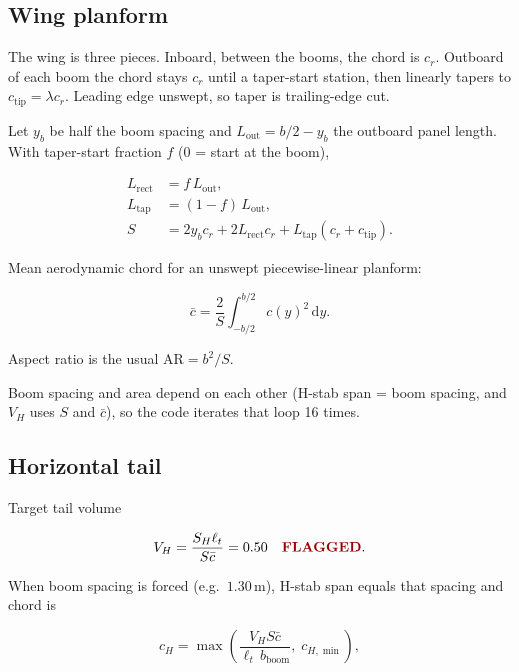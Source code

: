 \documentclass[11pt,letterpaper]{article}
\newcommand{\flag}{\textcolor{red!60!black}{\textbf{FLAGGED}}}
\begin{document}
\subsection{Wing planform}

The wing is three pieces. Inboard, between the booms, the chord is $c_r$. Outboard of each boom the chord stays $c_r$ until a taper-start station, then linearly tapers to $c_\mathrm{tip} = \lambda c_r$. Leading edge unswept, so taper is trailing-edge cut.

Let $y_b$ be half the boom spacing and $L_\mathrm{out} = b/2 - y_b$ the outboard panel length. With taper-start fraction $f$ (0 = start at the boom),

\begin{align}
  L_\mathrm{rect} &= f\, L_\mathrm{out}, \\
  L_\mathrm{tap}  &= (1-f)\, L_\mathrm{out}, \\
  S &= 2 y_b c_r + 2 L_\mathrm{rect} c_r + L_\mathrm{tap}(c_r + c_\mathrm{tip}).
\end{align}

Mean aerodynamic chord for an unswept piecewise-linear planform:

\begin{equation}
  \bar{c} = \frac{2}{S}\int_{-b/2}^{b/2} c(y)^2\,\mathrm{d}y.
\end{equation}

Aspect ratio is the usual $ \mathrm{AR} = b^2 / S $.

Boom spacing and area depend on each other (H-stab span = boom spacing, and $V_H$ uses $S$ and $\bar{c}$), so the code iterates that loop 16 times.

\subsection{Horizontal tail}

Target tail volume

\begin{equation}
  V_H = \frac{S_H \ell_t}{S \bar{c}} = 0.50 \quad \text{\flag{}}.
\end{equation}

When boom spacing is forced (e.g.\ $1.30\,\mathrm{m}$), H-stab span equals that spacing and chord is

\begin{equation}
  c_H = \max\left(\frac{V_H S \bar{c}}{\ell_t\, b_\mathrm{boom}},\;
  c_{H,\min}\right),
\end{equation}
\end{document}
